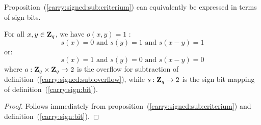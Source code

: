 \documentclass{article}
\newcommand{\zq}{\mbox{${\bf Z}_{q}$}}
\begin{document}
Proposition~(\ref{carry:signed:sub:criterium}) can equivalently be expressed
in terms of sign bits.
\begin{prop}\label{carry:signed:sub:criterium:2}
  For all $x,y\in\zq$, we have $o(x,y)=1$ \ifand:
  \[
    s(x)=0\mbox{\ and\ }s(y)=1\mbox{\ and\ }s(x-y)=1
  \]
or:
  \[
    s(x)=1\mbox{\ and\ }s(y)=0\mbox{\ and\ }s(x-y)=0
  \]
where $o:\zq\times\zq\rightarrow 2$ is the overflow for subtraction of 
  definition~(\ref{carry:signed:sub:overflow}), while $s:\zq\rightarrow 2$
  is the sign bit mapping of definition~(\ref{carry:sign:bit}).
\end{prop}
\begin{proof}
  Follows immediately from proposition~(\ref{carry:signed:sub:criterium})
  and definition~(\ref{carry:sign:bit}).
\end{proof}
\end{document}
